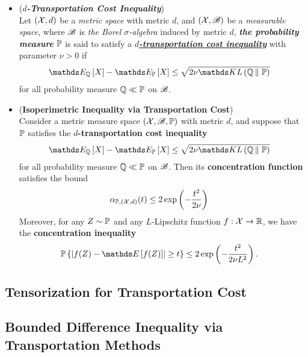 \documentclass[11pt]{article}
\begin{document}
\begin{itemize}
\item \begin{definition} (\emph{\textbf{$d$-Transportation Cost Inequality}}) \citep{wainwright2019high}\\
Let $({\mathcal X}, d)$ be a \emph{metric space} with metric $d$,  and $({\mathcal X}, {\mathscr B})$ be a \emph{measurable space}, where ${\mathscr B}$ is \emph{the Borel $\sigma$-algebra} induced by metric $d$, \emph{\textbf{the probability measure}} ${\mathbb P}$ is said to satisfy a \underline{\emph{\textbf{$d$-transportation cost inequality}}} with parameter $\nu > 0$ if
\begin{align}
\E{\bQ}{X} - \E{\bP}{X} &\le \sqrt{2\nu\kl{\bQ}{\bP}}  \label{def: transportation_cost_inequality}
\end{align} for all probability measure ${\mathbb Q} \ll {\mathbb P}$ on ${\mathscr B}$.
\end{definition}

\item \begin{theorem} (\textbf{Isoperimetric Inequality via Transportation Cost})\citep{wainwright2019high}\\
Consider a metric measure space $({\mathcal X}, {\mathscr B}, {\mathbb P})$ with metric $d$, and suppose that ${\mathbb P}$ satisfies the \textbf{$d$-transportation cost inequality} 
\begin{align*}
\E{\bQ}{X} - \E{\bP}{X} &\le \sqrt{2\nu\kl{\bQ}{\bP}} 
\end{align*}  for all probability measure ${\mathbb Q} \ll {\mathbb P}$ on ${\mathscr B}$. Then its \textbf{concentration function} satisfies the bound
\begin{align}
\alpha_{{\mathbb P}, ({\mathcal X}, d)}(t) &\le 2 \exp\left(- \frac{t^2}{2 \nu}\right) \label{ineqn: concentration_function_transport_cost}
\end{align} Moreover, for any $Z \sim {\mathbb P}$ and any $L$-Lipschitz function $f : {\mathcal X} \to {\mathbb R}$, we have the \textbf{concentration inequality}
\begin{align}
\bP\set{\abs{f(Z) - \E{}{f(Z)}} \ge t} &\le 2 \exp\paren{- \frac{t^2}{2 \nu L^2}}.  \label{ineqn: lipschitz_concentration_transport_cost}
\end{align}
\end{theorem}

\end{itemize}
\subsection{Tensorization for Transportation Cost}
\subsection{Bounded Difference Inequality via Transportation Methods}
\end{document}
